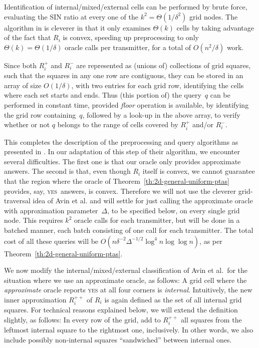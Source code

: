 \documentclass[11pt]{article}
\theoremstyle{remark}
\begin{document}
\begin{enumerate}[(i)]
Identification of internal/mixed/external cells can be performed by brute force, evaluating the SIN ratio at every one of the $k^2=\Theta(1/\delta^2)$ grid nodes.  The algorithm in \cite{aeklpr-sdciawn-12} is cleverer in that it only examines $\Theta(k)$ cells by taking advantage of the fact that $R_i$ is convex, speeding up preprocessing to only $\Theta(k)=\Theta(1/\delta)$ oracle calls per transmitter, for a total of $O(n^2/\delta)$ work.

Since both $R_i^+$ and $R_i^-$ are represented as (unions of) collections of grid squares, such that the squares in any one row are contiguous, they can be stored in an array of size $O(1/\delta)$, with two entries for each grid row, identifying the cells where each set starts and ends.  Thus (this portion of) the query~$q$ can be performed in constant time, provided \emph{floor} operation is available, by identifying the grid row containing~$q$, followed by a look-up in the above array, to verify whether or not $q$ belongs to the range of cells covered by $R_i^+$ and/or $R_i^-$.

This completes the description of the preprocessing and query algorithms as presented in \cite{aeklpr-sdciawn-12}.
In our adaptation of this step of their algorithm, we encounter several difficulties.  The first one is that our oracle only provides approximate answers.  The second is that, even though $R_i$ itself is convex, we cannot guarantee that the region where the oracle of Theorem~\ref{th:2d-general-uniform-ptas} provides, say, \textsc{yes}~answers, is convex.
Therefore we will not use the cleverer grid-traversal idea of Avin et al. \cite{aeklpr-sdciawn-12} and will settle for just calling the approximate oracle with approximation parameter~$\Delta$, to be specified below, on every single grid node.  This requires $k^2$ oracle calls for each transmitter, but will be done in a batched manner, each batch consisting of one call for each transmitter. 
The total cost of all these queries will be $O(n\delta^{-2}\Delta^{-1/2} \log^4 n \log \log n)$, as per Theorem~\ref{th:2d-general-uniform-ptas}.


We now modify the internal/mixed/external classification of Avin et al.\ for the situation where we use an approximate oracle, as follows:
A grid cell where the \emph{approximate} oracle reports \textsc{yes} at all four corners is \emph{internal}.  Intuitively, the new inner approximation $R^{++}_i$ of $R_i$ is again defined as the set of all internal grid squares.  For technical reasons explained below, we will extend the definition slightly, as follows:  In every row of the grid, add to $R_i^{++}$ all squares from the leftmost internal square to the rightmost one, inclusively.  In other words, we also include possibly non-internal squares ``sandwiched'' between internal ones.


\end{enumerate}
\end{document}
